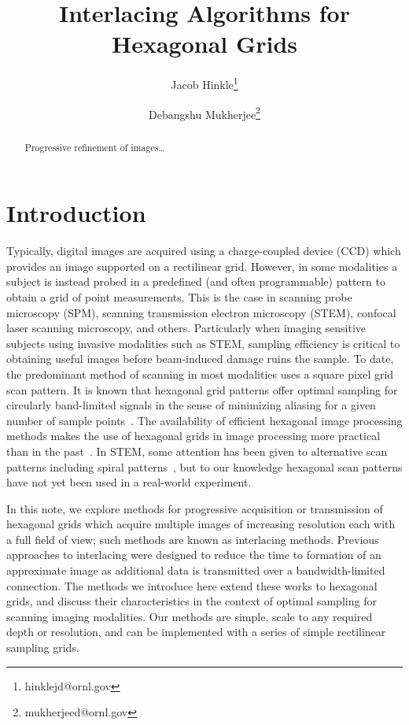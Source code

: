\documentclass{article}
\title{Interlacing Algorithms for Hexagonal Grids}
\author{Jacob Hinkle\thanks{hinklejd@ornl.gov} }
\author{Debangshu Mukherjee\thanks{mukherjeed@ornl.gov} }
\affil{
	Oak Ridge National Laboratory
}
\begin{document}
\maketitle
\begin{abstract}
Progressive refinement of images\ldots{}
\end{abstract}

\section{Introduction}
\label{sec:intro}

Typically, digital images are acquired using a charge-coupled device (CCD) which provides an image supported on a rectilinear grid.
%
However, in some modalities a subject is instead probed in a predefined (and often programmable) pattern to obtain a grid of point measurements.
%
This is the case in scanning probe microscopy (SPM), scanning transmission electron microscopy (STEM), confocal laser scanning microscopy, and others.
%
Particularly when imaging sensitive subjects using invasive modalities such as STEM, sampling efficiency is critical to obtaining useful images before beam-induced damage ruins the sample.
%
To date, the predominant method of scanning in most modalities uses a square pixel grid scan pattern.
%
It is known that hexagonal grid patterns offer optimal sampling for circularly band-limited signals in the sense of minimizing aliasing for a given number of sample points~\citep{petersen1962}.
%
The availability of efficient hexagonal image processing methods makes the use of hexagonal grids in image processing more practical than in the past~\citep{birdsong2016hexfft,middleton2006hexagonal}.
%
In STEM, some attention has been given to alternative scan patterns including spiral patterns~\citep{sang2016dynamic}, but to our knowledge hexagonal scan patterns have not yet been used in a real-world experiment.


In this note, we explore methods for progressive acquisition or transmission of hexagonal grids which acquire multiple images of increasing resolution each with a full field of view; such methods are known as interlacing methods.
%
Previous approaches to interlacing were designed to reduce the time to formation of an approximate image as additional data is transmitted over a bandwidth-limited connection.
%
The methods we introduce here extend these works to hexagonal grids, and discuss their characteristics in the context of optimal sampling for scanning imaging modalities.
%
Our methods are simple, scale to any required depth or resolution, and can be
implemented with a series of simple rectilinear sampling grids.
\end{document}

